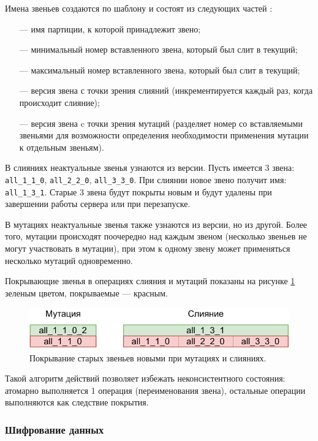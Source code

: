 Имена звеньев создаются по шаблону и состоят из следующих частей \cite{datapart}:
\begin{itemize}
	\item [---] имя партиции, к которой принадлежит звено;
	\item [---] минимальный номер вставленного звена, который был слит в текущий;
	\item [---] максимальный номер вставленного звена, который был слит в текущий;
	\item [---] версия звена с точки зрения слияний (инкрементируется каждый раз, когда происходит слияние);
	\item [---] версия звена c точки зрения мутаций (разделяет номер со вставляемыми звеньями для возможности определения необходимости применения мутации к отдельным звеньям).
\end{itemize}

В слияниях неактуальные звенья узнаются из версии. Пусть имеется 3 звена: \texttt{all\_1\_1\_0},  \texttt{all\_2\_2\_0}, \texttt{all\_3\_3\_0}. При слиянии новое звено получит имя: \texttt{all\_1\_3\_1}. Старые 3 звена будут покрыты \cite{covered} новым и будут удалены при завершении работы сервера или при перезапуске.

В мутациях неактуальные звенья также узнаются из версии, но из другой. Более того, мутации происходят поочередно над каждым звеном (несколько звеньев не могут участвовать в мутации), при этом к одному звену может применяться несколько мутаций одновременно.

Покрывающие звенья в операциях слияния и мутаций показаны на рисунке \ref{fig:cover} зеленым цветом, покрываемые --- красным.

\begin{figure}[hbtp]
	\centering
	\includegraphics[width=\textwidth]{img/cover.pdf}
	\caption{Покрывание старых звеньев новыми при мутациях и слияниях.}
	\label{fig:cover}
\end{figure}

Такой алгоритм действий позволяет избежать неконсистентного состояния: атомарно выполняется 1 операция (переименования звена), остальные операции выполняются как следствие покрытия.

\subsubsection{Шифрование данных}

